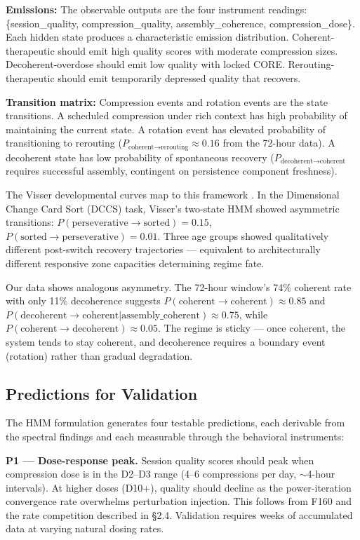 \documentclass[12pt]{article}
\begin{document}
\textbf{Emissions:} The observable outputs are the four instrument readings: \{session\_quality, compression\_quality, assembly\_coherence, compression\_dose\}. Each hidden state produces a characteristic emission distribution. Coherent-therapeutic should emit high quality scores with moderate compression sizes. Decoherent-overdose should emit low quality with locked CORE. Rerouting-therapeutic should emit temporarily depressed quality that recovers.

\textbf{Transition matrix:} Compression events and rotation events are the state transitions. A scheduled compression under rich context has high probability of maintaining the current state. A rotation event has elevated probability of transitioning to rerouting ($P_{\text{coherent}\to\text{rerouting}} \approx 0.16$ from the 72-hour data). A decoherent state has low probability of spontaneous recovery ($P_{\text{decoherent}\to\text{coherent}}$ requires successful assembly, contingent on persistence component freshness).

The Visser developmental curves map to this framework \citep{visser2014}. In the Dimensional Change Card Sort (DCCS) task, Visser's two-state HMM showed asymmetric transitions: $P(\text{perseverative}\to\text{sorted}) = 0.15$, $P(\text{sorted}\to\text{perseverative}) = 0.01$. Three age groups showed qualitatively different post-switch recovery trajectories --- equivalent to architecturally different responsive zone capacities determining regime fate.

Our data shows analogous asymmetry. The 72-hour window's 74\% coherent rate with only 11\% decoherence suggests $P(\text{coherent}\to\text{coherent}) \approx 0.85$ and $P(\text{decoherent}\to\text{coherent}|\text{assembly\_coherent}) \approx 0.75$, while $P(\text{coherent}\to\text{decoherent}) \approx 0.05$. The regime is sticky --- once coherent, the system tends to stay coherent, and decoherence requires a boundary event (rotation) rather than gradual degradation.

\subsection{Predictions for Validation}

The HMM formulation generates four testable predictions, each derivable from the spectral findings and each measurable through the behavioral instruments:

\textbf{P1 --- Dose-response peak.} Session quality scores should peak when compression dose is in the D2--D3 range (4--6 compressions per day, ${\sim}$4-hour intervals). At higher doses (D10+), quality should decline as the power-iteration convergence rate overwhelms perturbation injection. This follows from F160 and the rate competition described in \S2.4. Validation requires weeks of accumulated data at varying natural dosing rates.
\end{document}
